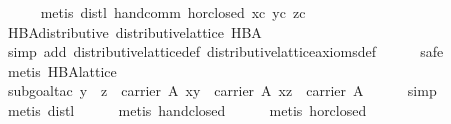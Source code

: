 \begin{isabellebody}
%
\isadelimproof
\ \ \ \ %
\endisadelimproof
%
\isatagproof
{}\isamarkupfalse%
\ {}metis\ distl\ hand{}comm\ hor{}closed\ xc\ yc\ zc{}%
\endisatagproof
{\isafoldproof}%
%
\isadelimproof
\isanewline
%
\endisadelimproof
\isanewline
\ \ \isamarkupfalse%
\ HBA{}distributive{}\ {}distributive{}lattice\ HBA{}\isanewline
%
\isadelimproof
\ \ \ \ %
\endisadelimproof
%
\isatagproof
{}\isamarkupfalse%
\ {}simp\ add{}\ distributive{}lattice{}def\ distributive{}lattice{}axioms{}def{}\isanewline
\ \ \ \ \isamarkupfalse%
\ safe\isanewline
\ \ \ \ \isamarkupfalse%
\ {}metis\ HBA{}lattice{}\isanewline
\ \ \ \ \isamarkupfalse%
\ {}subgoal{}tac\ {}y\ {}\ z\ {}\ carrier\ A{}\ {}x{}y\ {}\ carrier\ A{}\ {}x{}z\ {}\ carrier\ A{}{}\isanewline
\ \ \ \ \isamarkupfalse%
\ simp\isanewline
\ \ \ \ \isamarkupfalse%
\ {}metis\ distl{}\isanewline
\ \ \ \ \isamarkupfalse%
\ {}metis\ hand{}closed{}{}\isanewline
\ \ \ \ \isamarkupfalse%
\ {}metis\ hor{}closed{}\isanewline

\end{isabellebody}
